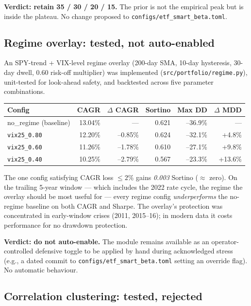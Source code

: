 \documentclass[11pt,a4paper]{article}
\begin{document}
\textbf{Verdict: retain 35 / 30 / 20 / 15.} The prior is not the empirical peak but is inside the plateau. No change proposed to \texttt{configs/etf\_smart\_beta.toml}.

\subsection{Regime overlay: tested, not auto-enabled}

An SPY-trend + VIX-level regime overlay (200-day SMA, 10-day hysteresis, 30-day dwell, 0.60 risk-off multiplier) was implemented (\texttt{src/portfolio/regime.py}), unit-tested for look-ahead safety, and backtested across five parameter combinations.

\begin{table}[H]
\centering
\renewcommand{\arraystretch}{1.3}
\begin{tabular}{lrrrrr}
\toprule
Config & CAGR & $\Delta$ CAGR & Sortino & Max DD & $\Delta$ MDD \\
\midrule
no\_regime (baseline) & 13.04\% & --- & 0.621 & --36.9\% & --- \\
\texttt{vix25\_0.80} & 12.20\% & --0.85\% & 0.624 & --32.1\% & +4.8\% \\
\texttt{vix25\_0.60} & 11.26\% & --1.78\% & 0.610 & --27.1\% & +9.8\% \\
\texttt{vix25\_0.40} & 10.25\% & --2.79\% & 0.567 & --23.3\% & +13.6\% \\
\bottomrule
\end{tabular}
\end{table}

The one config satisfying CAGR loss $\leq 2$\% gains \emph{0.003} Sortino ($\approx$ zero). On the trailing 5-year window --- which includes the 2022 rate cycle, the regime the overlay should be most useful for --- every regime config \emph{underperforms} the no-regime baseline on both CAGR and Sharpe. The overlay's protection was concentrated in early-window crises (2011, 2015--16); in modern data it costs performance for no drawdown protection.

\textbf{Verdict: do not auto-enable.} The module remains available as an operator-controlled defensive toggle to be applied by hand during acknowledged stress (e.g., a dated commit to \texttt{configs/etf\_smart\_beta.toml} setting an override flag). No automatic behaviour.

\subsection{Correlation clustering: tested, rejected}
\end{document}
